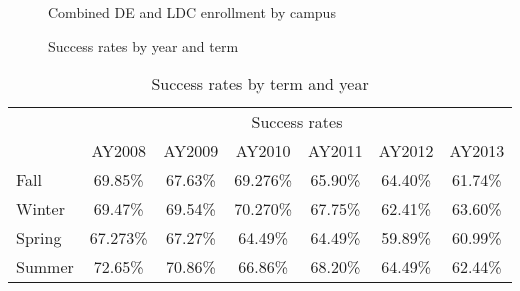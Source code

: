 \begin{figure}[!htb]
  \begin{widepage}
    \begin{minipage}[t]{.45\textwidth}
     	 \centering
         
          \caption{Combined DE and LDC enrollment by campus}
          \label{app:fig:totalenrollmentCampus}
   \end{minipage}%
    \hspace{1em}
    \begin{minipage}[t]{.45\textwidth}
    	 \centering
          
          \caption{Success rates by year and term}
   \end{minipage}
  \end{widepage}
\end{figure}


\begin{table}[!htb]
	\centering
	\caption{Success rates by term and year}
    \label{app:tab:successratesbyterm}
	\begin{tabular}{l*{6}{c}}
		\toprule
		& \multicolumn{6}{c}{Success rates}\\
		\cmidrule{2-7}
		       & AY2008  & AY2009  & AY2010  & AY2011  & AY2012  & AY2013  \\
		\cmidrule{2-7}
		Fall   & 69.85\% & 67.63\% & 69.276\% & 65.90\% & 64.40\% & 61.74\% \\ 
		Winter & 69.47\% & 69.54\% & 70.270\% & 67.75\% & 62.41\% & 63.60\% \\
		Spring & 67.273\% & 67.27\% & 64.49\% & 64.49\% & 59.89\% & 60.99\% \\
		Summer & 72.65\% & 70.86\% & 66.86\% & 68.20\% & 64.49\% & 62.44\% \\
		\bottomrule
	\end{tabular}
\end{table}
